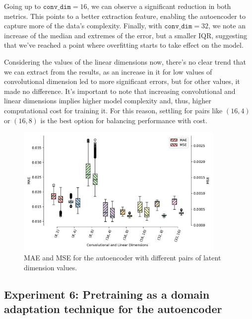 Going up to $\texttt{conv\_dim}=16$, we can observe a significant reduction in both metrics. This points to a better extraction feature, enabling the autoencoder to capture more of the data's complexity. Finally, with $\texttt{conv\_dim}=32$, we note an increase of the median and extremes of the error, but a smaller \gls{IQR}, suggesting that we've reached a point where overfitting starts to take effect on the model.

Considering the values of the linear dimensions now, there's no clear trend that we can extract from the results, as an increase in it for low values of convolutional dimension led to more significant errors, but for other values, it made no difference. It's important to note that increasing convolutional and linear dimensions implies higher model complexity and, thus, higher computational cost for training it. For this reason, settling for pairs like $(16, 4)$ or $(16, 8)$ is the best option for balancing performance with cost.

\begin{figure}[!ht]
\noindent\hspace{0.5mm}\includegraphics[width=0.9\textwidth]{./figures/exp05/boxplot.pdf}
\caption{\gls{MAE} and \gls{MSE} for the autoencoder with different pairs of latent dimension values.}
\label{fig:exp05boxplot}
\end{figure}

\subsection{Experiment 6: Pretraining as a domain adaptation technique for the autoencoder} \label{ssec:exp6}


